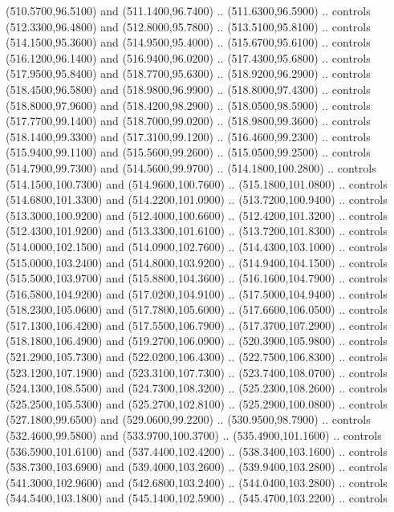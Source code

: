 {\begin{scope}[y=0.80pt, x=0.80pt, yscale=-1, xscale=1, inner sep=0pt, outer sep=0pt, #1]
      (510.5700,96.5100) and (511.1400,96.7400) .. (511.6300,96.5900) .. controls
      (512.3300,96.4800) and (512.8000,95.7800) .. (513.5100,95.8100) .. controls
      (514.1500,95.3600) and (514.9500,95.4000) .. (515.6700,95.6100) .. controls
      (516.1200,96.1400) and (516.9400,96.0200) .. (517.4300,95.6800) .. controls
      (517.9500,95.8400) and (518.7700,95.6300) .. (518.9200,96.2900) .. controls
      (518.4500,96.5800) and (518.9800,96.9900) .. (518.8000,97.4300) .. controls
      (518.8000,97.9600) and (518.4200,98.2900) .. (518.0500,98.5900) .. controls
      (517.7700,99.1400) and (518.7000,99.0200) .. (518.9800,99.3600) .. controls
      (518.1400,99.3300) and (517.3100,99.1200) .. (516.4600,99.2300) .. controls
      (515.9400,99.1100) and (515.5600,99.2600) .. (515.0500,99.2500) .. controls
      (514.7900,99.7300) and (514.5600,99.9700) .. (514.1800,100.2800) .. controls
      (514.1500,100.7300) and (514.9600,100.7600) .. (515.1800,101.0800) .. controls
      (514.6800,101.3300) and (514.2200,101.0900) .. (513.7200,100.9400) .. controls
      (513.3000,100.9200) and (512.4000,100.6600) .. (512.4200,101.3200) .. controls
      (512.4300,101.9200) and (513.3300,101.6100) .. (513.7200,101.8300) .. controls
      (514.0000,102.1500) and (514.0900,102.7600) .. (514.4300,103.1000) .. controls
      (515.0000,103.2400) and (514.8000,103.9200) .. (514.9400,104.1500) .. controls
      (515.5000,103.9700) and (515.8800,104.3600) .. (516.1600,104.7900) .. controls
      (516.5800,104.9200) and (517.0200,104.9100) .. (517.5000,104.9400) .. controls
      (518.2300,105.0600) and (517.7800,105.6000) .. (517.6600,106.0500) .. controls
      (517.1300,106.4200) and (517.5500,106.7900) .. (517.3700,107.2900) .. controls
      (518.1800,106.4900) and (519.2700,106.0900) .. (520.3900,105.9800) .. controls
      (521.2900,105.7300) and (522.0200,106.4300) .. (522.7500,106.8300) .. controls
      (523.1200,107.1900) and (523.3100,107.7300) .. (523.7400,108.0700) .. controls
      (524.1300,108.5500) and (524.7300,108.3200) .. (525.2300,108.2600) .. controls
      (525.2500,105.5300) and (525.2700,102.8100) .. (525.2900,100.0800) .. controls
      (527.1800,99.6500) and (529.0600,99.2200) .. (530.9500,98.7900) .. controls
      (532.4600,99.5800) and (533.9700,100.3700) .. (535.4900,101.1600) .. controls
      (536.5900,101.6100) and (537.4400,102.4200) .. (538.3400,103.1600) .. controls
      (538.7300,103.6900) and (539.4000,103.2600) .. (539.9400,103.2800) .. controls
      (541.3000,102.9600) and (542.6800,103.2400) .. (544.0400,103.2800) .. controls
      (544.5400,103.1800) and (545.1400,102.5900) .. (545.4700,103.2200) .. controls

\end{scope}}
